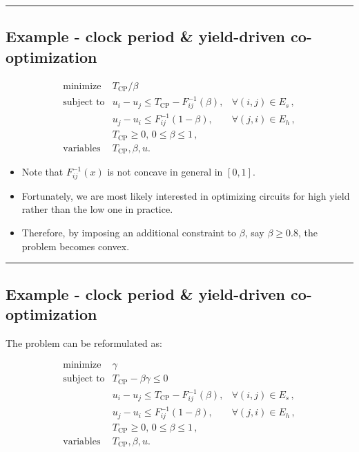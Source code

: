 \documentclass[
]{article}
\providecommand{\tightlist}{%
  \setlength{\itemsep}{0pt}\setlength{\parskip}{0pt}}
\begin{document}
\begin{center}\rule{0.5\linewidth}{0.5pt}\end{center}

\subsection{Example - clock period \& yield-driven
co-optimization}\label{example---clock-period-yield-driven-co-optimization}

\[\begin{array}{cll}
   \text{minimize} &T_\text{CP} / \beta \\
   \text{subject to} & u_i - u_j \le T_\text{CP} - F_{ij}^{-1}(\beta), & \forall (i,j) \in E_s \,,\\
                     & u_j - u_i \le F_{ij}^{-1}(1 - \beta), & \forall (j,i) \in E_h \,, \\
                     & T_\text{CP} \ge 0, \, 0 \le \beta \le 1 \, , \\
    \text{variables} &T_\text{CP}, \beta, u.
   \end{array}\]

\begin{itemize}
\tightlist
\item
  Note that \(F_{ij}^{-1}(x)\) is not concave in general in \([0, 1]\).
\item
  Fortunately, we are most likely interested in optimizing circuits for
  high yield rather than the low one in practice.
\item
  Therefore, by imposing an additional constraint to \(\beta\), say
  \(\beta \geq 0.8\), the problem becomes convex.
\end{itemize}

\begin{center}\rule{0.5\linewidth}{0.5pt}\end{center}

\subsection{Example - clock period \& yield-driven
co-optimization}\label{example---clock-period-yield-driven-co-optimization-1}

The problem can be reformulated as:

\[\begin{array}{cll}
   \text{minimize}   & \gamma \\
   \text{subject to} & T_\text{CP} - \beta \gamma \le 0\\
                     & u_i - u_j \le T_\text{CP} - F_{ij}^{-1}(\beta), & \forall (i,j) \in E_s \,,\\
                     & u_j - u_i \le F_{ij}^{-1}(1 - \beta), & \forall (j,i) \in E_h \,, \\
                     & T_\text{CP} \ge 0, \, 0 \le \beta \le 1 \, , \\
    \text{variables} &T_\text{CP}, \beta, u.
   \end{array}\]
\end{document}
